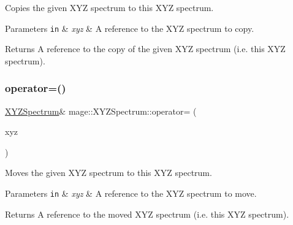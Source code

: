 Copies the given X\+YZ spectrum to this X\+YZ spectrum.


\begin{DoxyParams}[1]{Parameters}
\mbox{\tt in}  & {\em xyz} & A reference to the X\+YZ spectrum to copy. \\
\hline
\end{DoxyParams}
\begin{DoxyReturn}{Returns}
A reference to the copy of the given X\+YZ spectrum (i.\+e. this X\+YZ spectrum). 
\end{DoxyReturn}
\hypertarget{structmage_1_1_x_y_z_spectrum_a5191cffff5e1560164a34d43aa72441b}{}\label{structmage_1_1_x_y_z_spectrum_a5191cffff5e1560164a34d43aa72441b} 
\subsubsection{\texorpdfstring{operator=()}{operator=()}\hspace{0.1cm}{\footnotesize\ttfamily [2/2]}}
{\footnotesize\ttfamily \hyperlink{structmage_1_1_x_y_z_spectrum}{X\+Y\+Z\+Spectrum}\& mage\+::\+X\+Y\+Z\+Spectrum\+::operator= (\begin{DoxyParamCaption}\item[{\hyperlink{structmage_1_1_x_y_z_spectrum}{X\+Y\+Z\+Spectrum} \&\&}]{xyz }\end{DoxyParamCaption})\hspace{0.3cm}{\ttfamily [default]}}

Moves the given X\+YZ spectrum to this X\+YZ spectrum.


\begin{DoxyParams}[1]{Parameters}
\mbox{\tt in}  & {\em xyz} & A reference to the X\+YZ spectrum to move. \\
\hline
\end{DoxyParams}
\begin{DoxyReturn}{Returns}
A reference to the moved X\+YZ spectrum (i.\+e. this X\+YZ spectrum). 
\end{DoxyReturn}
